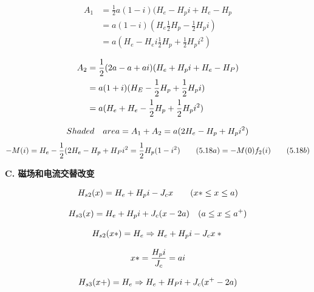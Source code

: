 \begin{align}%
A_{1}&=\frac{1}{2}a(1-i)(H_{e}-H_{p}i+H_{e}-H_{p}\\
&=a(1-i)(H_{e}\frac{1}{2}H_{p}-\frac{1}{2}H_{p}i)\\
&=a(H_{e}-H_{e}i\frac{1}{2}H_{p}+\frac{1}{2}H_{p}i^{2})
\end{align}



\begin{align}%
A_{2}&=\frac{1}{2}(2a-a+ai)(H_{e}+H_{p}i+H_{e}-H_{P})\\\notag
&=a(1+i)(H_E-\frac{1}{2}H_{p}+\frac{1}{2}H_{p}i)\\\notag
&=a(H_{e}+H_{e}-\frac{1}{2}H_{p}+\frac{1}{2}H_{p}i^{2})
\end{align}



\begin{equation}%
Shaded\quad area=A_{1}+A_{2}\\
=a(2H_{e}-H_{p}+H_{p}i^{2})
\end{equation}
\begin{equation}%
-M(i)=H_{e}-\frac{1}{2}(2H_{e}-H_{p}+H_{P}i^{2}\\
=\frac{1}{2}H_{p}(1-i^{2})\qquad(5.18a)\\
=-M(0)f_{2}(i)\qquad(5.18b)
\end{equation}


\textbf{C. 磁场和电流交替改变}

\begin{equation}%
H_{s2}(x)=H_{e}+H_{p}i-J_{c}x\qquad(x*\leq x\leq a)\\
\end{equation}

\begin{equation}%
H_{s3}(x)=H_{e}+H_{p}i+J_{c}(x-2a)\quad(a\leq x\leq a^{+})\\
\end{equation}

\begin{equation}%
H_{s2}(x*)=H_{e}\Rightarrow H_{e}+H_{p}i-J_{c}x*\\
\end{equation}

\begin{equation}%
x*=\frac{H_{p}i}{J_{c}}=ai\\
\end{equation}

\begin{equation}%
H_{s3}(x+)=H_{e}\Rightarrow H_{e}+H_{P}i+J_{c}(x^{+}-2a)\\
\end{equation}

